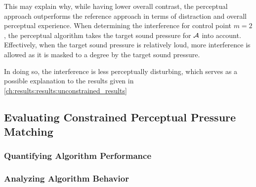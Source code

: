 This may explain why, while having lower overall contrast, the perceptual approach outperforms the 
reference approach in terms of distraction and overall perceptual experience.
When determining the interference for control point $m=2$, the perceptual algorithm takes the 
target sound pressure for $\mathcal{A}$ into account. 
Effectively, when the target sound pressure is relatively loud, more interference is allowed 
as it is masked to a degree by the target sound pressure.

In doing so, the interference is less perceptually disturbing, which serves as a possible explanation to 
the results given in \autoref{ch:results:results:unconstrained_results}

\subsection{Evaluating Constrained Perceptual Pressure Matching}
\label{ch:results:results:constrained_results}

\subsubsection*{Quantifying Algorithm Performance}


\subsubsection*{Analyzing Algorithm Behavior}

